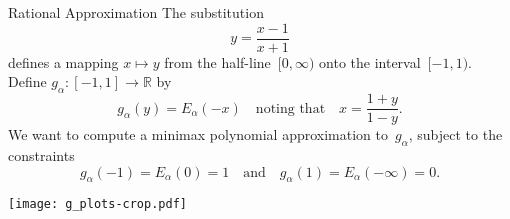 \begin{frame}{Rational Approximation}
The substitution
\[
y=\frac{x-1}{x+1}
\]
defines a mapping $x\mapsto y$ from the half-line~$[0,\infty)$ onto the 
interval~$[-1,1)$.  Define $g_\alpha:[-1,1]\to\mathbb{R}$ by
\[
g_\alpha(y)=E_\alpha(-x)\quad\text{noting that}\quad x=\frac{1+y}{1-y}.
\]
We want to compute a minimax polynomial approximation to~$g_\alpha$, subject to 
the constraints
\[
g_\alpha(-1)=E_\alpha(0)=1\quad\text{and}\quad g_\alpha(1)=E_\alpha(-\infty)=0.
\]
\end{frame}
\begin{frame}
\begin{center}
\texttt{[image: g\_plots-crop.pdf]}
\end{center}
\end{frame}

